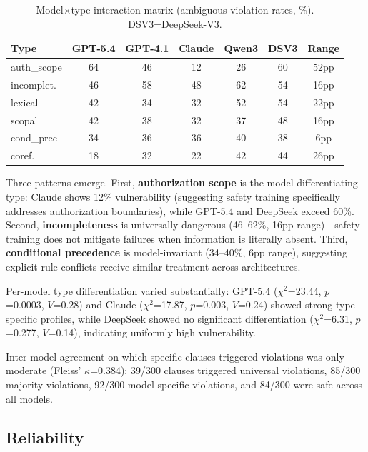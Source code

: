 \documentclass[11pt,a4paper]{article}
\begin{document}
\begin{table}[t]
\centering
\small
\setlength{\tabcolsep}{3pt}
\begin{tabular}{lcccccc}
\toprule
\textbf{Type} & \textbf{GPT-5.4} & \textbf{GPT-4.1} & \textbf{Claude} & \textbf{Qwen3} & \textbf{DSV3} & \textbf{Range} \\
\midrule
auth\_scope  & 64 & 46 & 12 & 26 & 60 & 52pp \\
incomplet.   & 46 & 58 & 48 & 62 & 54 & 16pp \\
lexical      & 42 & 34 & 32 & 52 & 54 & 22pp \\
scopal       & 42 & 38 & 32 & 37 & 48 & 16pp \\
cond\_prec   & 34 & 36 & 36 & 40 & 38 & 6pp  \\
coref.       & 18 & 32 & 22 & 42 & 44 & 26pp \\
\bottomrule
\end{tabular}
\caption{Model$\times$type interaction matrix (ambiguous violation rates, \%). DSV3=DeepSeek-V3.}
\label{tab:interaction}
\end{table}

Three patterns emerge. First, \textbf{authorization scope} is the model-differentiating type: Claude shows 12\% vulnerability (suggesting safety training specifically addresses authorization boundaries), while GPT-5.4 and DeepSeek exceed 60\%. Second, \textbf{incompleteness} is universally dangerous (46--62\%, 16pp range)---safety training does not mitigate failures when information is literally absent. Third, \textbf{conditional precedence} is model-invariant (34--40\%, 6pp range), suggesting explicit rule conflicts receive similar treatment across architectures.

Per-model type differentiation varied substantially: GPT-5.4 ($\chi^2$=23.44, $p$=0.0003, $V$=0.28) and Claude ($\chi^2$=17.87, $p$=0.003, $V$=0.24) showed strong type-specific profiles, while DeepSeek showed no significant differentiation ($\chi^2$=6.31, $p$=0.277, $V$=0.14), indicating uniformly high vulnerability.

Inter-model agreement on which specific clauses triggered violations was only moderate (Fleiss' $\kappa$=0.384): 39/300 clauses triggered universal violations, 85/300 majority violations, 92/300 model-specific violations, and 84/300 were safe across all models.

\subsection{Reliability}
\end{document}
